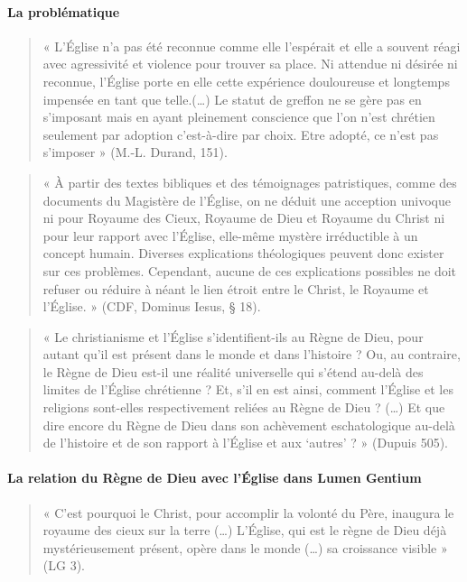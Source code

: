 \paragraph{La problématique} 


\begin{quote}
    « L’Église n’a pas été reconnue comme elle l’espérait et elle a souvent réagi avec agressivité et violence pour trouver sa place. Ni attendue  ni désirée ni reconnue, l’Église porte en elle cette expérience douloureuse et longtemps impensée en tant que telle.(…) Le  statut de greffon  ne se gère pas en s’imposant mais en ayant pleinement conscience que l’on n’est chrétien seulement par adoption c’est-à-dire par choix. Etre adopté, ce n’est pas s’imposer » (M.-L. Durand, 151). 
\end{quote}

\begin{quote}
    « À partir des textes bibliques et des témoignages patristiques, comme des documents du Magistère de l'Église, on ne déduit une acception univoque ni pour Royaume des Cieux, Royaume de Dieu et Royaume du Christ ni pour leur rapport avec l'Église, elle-même mystère irréductible à un concept humain. Diverses explications théologiques peuvent donc exister sur ces problèmes. Cependant, aucune de ces explications possibles ne doit refuser ou réduire à néant le lien étroit entre le Christ, le Royaume et l'Église. » (CDF, Dominus Iesus, § 18). 
\end{quote}

\begin{quote}
    « Le christianisme et l’Église s’identifient-ils au Règne de Dieu, pour autant qu’il est présent dans le monde et dans l’histoire ? Ou, au contraire, le Règne de Dieu est-il une réalité universelle qui s’étend au-delà des limites de l’Église chrétienne ? Et, s’il en est ainsi, comment l’Église et les religions sont-elles respectivement reliées au Règne de Dieu ? (…) Et que dire encore du Règne de Dieu dans son achèvement eschatologique au-delà de l’histoire et de son rapport à l’Église et aux ‘autres’ ? » (Dupuis 505). 
\end{quote}
\paragraph{La relation du Règne de Dieu avec l’Église dans Lumen Gentium } 
\begin{quote}
    « C’est pourquoi le Christ, pour accomplir la volonté du Père, inaugura le royaume des cieux sur la terre (…) L’Église, qui est le règne de Dieu déjà mystérieusement présent, opère dans le monde (…) sa croissance visible » (LG 3).  
\end{quote}

